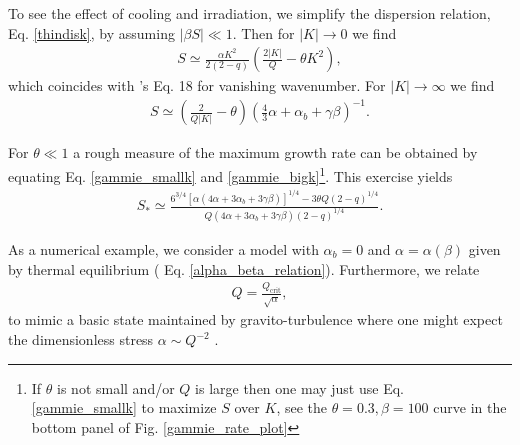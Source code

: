 To see the effect of cooling and irradiation, we simplify the
dispersion relation, Eq. \ref{thindisk}, by assuming $|\beta S|\ll
1$. Then for $|K| \to 0$ we find
\begin{align}\label{gammie_smallk}
  S\simeq \frac{\alpha K^2}{2(2-q)}\left(\frac{2|K|}{Q} - \theta
  K^2\right), 
\end{align}
which coincides with \citeauthor{gammie96}'s Eq. 18 for vanishing
wavenumber. For $|K|\to\infty$ we find
\begin{align}\label{gammie_bigk}
  S \simeq\left(\frac{2}{Q|K|} - \theta\right)\left(\frac{4}{3}\alpha + 
  \alpha_b + \gamma\beta\right)^{-1}.
\end{align}


For $\theta\ll1$ a rough measure of the maximum growth rate can be obtained by
equating Eq. \ref{gammie_smallk} and \ref{gammie_bigk}\footnote{If
  $\theta$ is not small and/or $Q$  is large then one may just use Eq. \ref{gammie_smallk}
  to maximize $S$ over $K$, see the $\theta=0.3,\beta=100$ curve in the bottom
  panel of Fig. \ref{gammie_rate_plot}}.  
This exercise yields 
\begin{align}\label{gammie_maxrate_simple}
  S_*\simeq \frac{
    6^{3/4}\left[\alpha\left(4\alpha +
      3\alpha_b + 3\gamma\beta\right)\right]^{1/4} - 3\theta
    Q(2-q)^{1/4}}{Q\left(4\alpha + 3\alpha_b +
    3\gamma\beta\right)(2-q)^{1/4}}. 
\end{align} 

As a numerical example, we consider a model with $\alpha_b=0$ and
$\alpha=\alpha(\beta)$ given by thermal equilibrium (
Eq. \ref{alpha_beta_relation}). Furthermore, we relate 
\begin{align}
  Q = \frac{Q_\mathrm{crit}}{\sqrt{\alpha}},\label{Qalpha}
\end{align}
to mimic a basic state maintained by gravito-turbulence where one
might expect the dimensionless stress $\alpha \sim Q^{-2}$
\citep{lin87}.   

